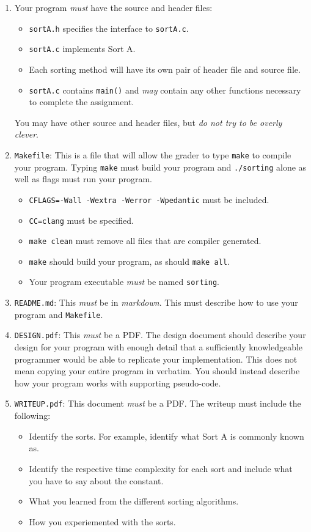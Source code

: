 \documentclass{article}
\begin{document}
\begin{enumerate}
\item Your program \emph{must} have the source and header files:
\begin{itemize}
\item \texttt{sortA.h} specifies the interface to \texttt{sortA.c}.
\item \texttt{sortA.c} implements Sort A.
\item Each sorting method will have its own pair of header file and source
file.
\item \texttt{sortA.c} contains \texttt{main()} and \emph{may} contain any other functions necessary to complete the assignment.
\end{itemize}
You may have other source and header files, but \emph{do not try to be overly clever}.

\item \texttt{Makefile}: This is a file that will allow the grader
to type \texttt{make} to compile your program. Typing \texttt{make} must build your program and \texttt{./sorting} alone as well as flags must run your program.
  \begin{itemize}
  \item \texttt{CFLAGS=-Wall -Wextra -Werror -Wpedantic} must be included.
  \item \texttt{CC=clang} must be specified.
  \item \texttt{make clean} must remove all files that are compiler generated.
  \item \texttt{make} should build your program, as should \texttt{make all}.
  \item Your program executable \emph{must} be named \texttt{sorting}.

  \end{itemize}

\item \texttt{README.md}: This \emph{must} be in \emph{markdown}.
This must describe how to use your program and \texttt{Makefile}.

\item \texttt{DESIGN.pdf}: This \emph{must} be a PDF. The design document
should describe your design for your program with enough detail
that a sufficiently knowledgeable programmer would be able to
replicate your implementation. This does not mean copying your
entire program in verbatim. You should instead describe how your
program works with supporting pseudo-code.

\item \texttt{WRITEUP.pdf}: This document \emph{must} be a PDF. The writeup must include the following:
\begin{itemize}
  \item Identify the sorts. For example, identify what Sort A is commonly known as.
  \item Identify the respective time complexity for each sort and include what you have to say about the constant.
  \item What you learned from the different sorting algorithms.
  \item How you experiemented with the sorts.


\end{itemize}
\end{enumerate}
\end{document}
